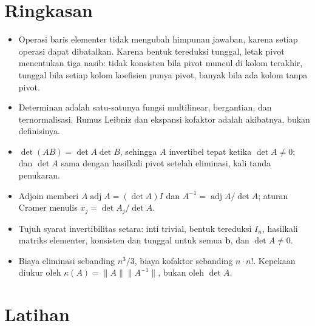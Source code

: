 \section{Ringkasan}

\begin{ringkasan}
\begin{itemize}
  \item Operasi baris elementer tidak mengubah himpunan jawaban, karena setiap operasi dapat
        dibatalkan. Karena bentuk tereduksi tunggal, letak pivot menentukan tiga nasib: tidak
        konsisten bila pivot muncul di kolom terakhir, tunggal bila setiap kolom koefisien
        punya pivot, banyak bila ada kolom tanpa pivot.
  \item Determinan adalah satu-satunya fungsi multilinear, bergantian, dan ternormalisasi.
        Rumus Leibniz dan ekspansi kofaktor adalah akibatnya, bukan definisinya.
  \item $\det(AB)=\det A\det B$, sehingga $A$ invertibel tepat ketika $\det A\neq0$; dan
        $\det A$ sama dengan hasilkali pivot setelah eliminasi, kali tanda penukaran.
  \item Adjoin memberi $A\operatorname{adj}A=(\det A)I$ dan
        $A^{-1}=\operatorname{adj}A/\det A$; aturan Cramer menulis
        $x_{j}=\det A_{j}/\det A$.
  \item Tujuh syarat invertibilitas setara: inti trivial, bentuk tereduksi $I_{n}$, hasilkali
        matriks elementer, konsisten dan tunggal untuk semua $\mathbf{b}$, dan
        $\det A\neq0$.
  \item Biaya eliminasi sebanding $n^{3}/3$, biaya kofaktor sebanding $n\cdot n!$. Kepekaan
        diukur oleh $\kappa(A)=\lVert A\rVert\lVert A^{-1}\rVert$, bukan oleh $\det A$.
\end{itemize}
\end{ringkasan}

\section{Latihan}


